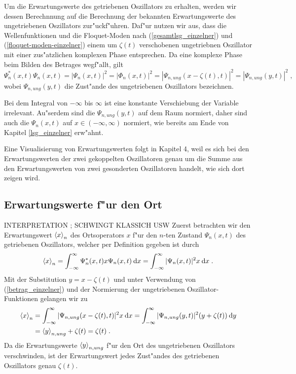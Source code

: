   Um die Erwartungswerte des getriebenen Oszillators zu erhalten, werden wir dessen Berechnnung auf die Berechnung der bekannten Erwartungswerte des ungetriebenen Oszillators zur"uckf"uhren.
  Daf"ur nutzen wir aus, dass die Wellenfunktionen und die Floquet-Moden nach (\ref{gesamtlsg_einzelner}) und (\ref{floquet-moden-einzelner}) einem um $\zeta(t)$ verschobenen ungetriebnen Oszillator mit einer zus"atzlichen komplexen Phase entsprechen.
  Da eine komplexe Phase beim Bilden des Betrages wegf"allt, gilt
  \begin{equation}
    \Psi_n^*(x,t)\Psi_n(x,t) = |\Psi_n(x,t)|^2 = |\Phi_n(x,t)|^2 = |\Psi_{n,ung}(x-\zeta(t),t)|^2 = |\Psi_{n,ung}(y,t)|^2 \; ,
    \label{betrag_einzelner}
  \end{equation}
  wobei $\Psi_{n,ung}(y,t)$ die Zust"ande des ungetriebenen Oszillators bezeichnen.

  Bei dem Integral von $-\infty$ bis $\infty$ ist eine konstante Verschiebung der Variable irrelevant.
  Au"serdem sind die $\Psi_{n,ung}(y,t)$ auf dem Raum normiert, daher sind auch die $\Psi_n(x,t)$ auf $x \in (-\infty,\infty)$ normiert, wie bereits am Ende von Kapitel \ref{lsg_einzelner} erw"ahnt.

  Eine Visualisierung von Erwartungswerten folgt in Kapitel 4, weil es sich bei den Erwartungswerten der zwei gekoppelten Oszillatoren genau um die Summe aus den Erwartungswerten von zwei gesonderten Oszillatoren handelt, wie sich dort zeigen wird.

  \subsection{Erwartungswerte f"ur den Ort}
  INTERPRETATION ; SCHWINGT KLASSICH USW
    Zuerst betrachten wir den Erwartungswert $\braket{x}_n$ des Ortsoperators $x$ f"ur den $n$-ten Zustand $\Psi_n(x,t)$ des getriebenen Oszillators, welcher per Definition gegeben ist durch
    \begin{equation}
      \braket{x}_n = \int_{-\infty}^{\infty} \Psi_n^*(x,t)x\Psi_n(x,t) \: \text dx
      = \int_{-\infty}^{\infty} |\Psi_n(x,t)|^2 x \: \text dx \; .
    \end{equation}
    Mit der Substitution $y=x-\zeta(t)$ und unter Verwendung von (\ref{betrag_einzelner}) und der Normierung der ungetriebenen Oszillator-Funktionen gelangen wir zu
    \begin{align}
      \begin{split}
        \braket{x}_n &= \int_{-\infty}^{\infty} |\Psi_{n,ung}(x-\zeta(t),t)|^2 x \: \text dx
        = \int_{-\infty}^{\infty} |\Psi_{n,ung}(y,t)|^2 (y+\zeta(t)) \: \text dy \\
        &= \braket{y}_{n,ung} + \zeta(t) = \zeta(t) \; .
      \end{split}
    \end{align}
    Da die Erwartungswerte $\braket{y}_{n,ung}$ f"ur den Ort des ungetriebenen Oszillators verschwinden, ist der Erwartungswert jedes Zust"andes des getriebenen Oszillators genau $\zeta(t)$.

